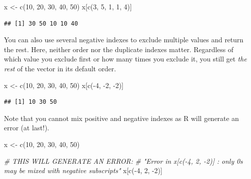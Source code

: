 \documentclass[
]{book}
\newenvironment{Shaded}{\begin{snugshade}}{\end{snugshade}}
\newcommand{\CommentTok}[1]{\textcolor[rgb]{0.56,0.35,0.01}{\textit{#1}}}
\newcommand{\DecValTok}[1]{\textcolor[rgb]{0.00,0.00,0.81}{#1}}
\newcommand{\FunctionTok}[1]{\textcolor[rgb]{0.00,0.00,0.00}{#1}}
\newcommand{\NormalTok}[1]{#1}
\newcommand{\OtherTok}[1]{\textcolor[rgb]{0.56,0.35,0.01}{#1}}
\newcommand{\SpecialCharTok}[1]{\textcolor[rgb]{0.00,0.00,0.00}{#1}}
\begin{document}
\begin{Shaded}
\begin{Highlighting}[]
\NormalTok{x }\OtherTok{\textless{}{-}} \FunctionTok{c}\NormalTok{(}\DecValTok{10}\NormalTok{, }\DecValTok{20}\NormalTok{, }\DecValTok{30}\NormalTok{, }\DecValTok{40}\NormalTok{, }\DecValTok{50}\NormalTok{)}
\NormalTok{x[}\FunctionTok{c}\NormalTok{(}\DecValTok{3}\NormalTok{, }\DecValTok{5}\NormalTok{, }\DecValTok{1}\NormalTok{, }\DecValTok{1}\NormalTok{, }\DecValTok{4}\NormalTok{)]}
\end{Highlighting}
\end{Shaded}

\begin{verbatim}
## [1] 30 50 10 10 40
\end{verbatim}

You can also use several negative indexes to exclude multiple values and return the rest. Here, neither order nor the duplicate indexes matter. Regardless of which value you exclude first or how many times you exclude it, you still get \emph{the rest} of the vector in its default order.

\begin{Shaded}
\begin{Highlighting}[]
\NormalTok{x }\OtherTok{\textless{}{-}} \FunctionTok{c}\NormalTok{(}\DecValTok{10}\NormalTok{, }\DecValTok{20}\NormalTok{, }\DecValTok{30}\NormalTok{, }\DecValTok{40}\NormalTok{, }\DecValTok{50}\NormalTok{)}
\NormalTok{x[}\FunctionTok{c}\NormalTok{(}\SpecialCharTok{{-}}\DecValTok{4}\NormalTok{, }\SpecialCharTok{{-}}\DecValTok{2}\NormalTok{, }\SpecialCharTok{{-}}\DecValTok{2}\NormalTok{)]}
\end{Highlighting}
\end{Shaded}

\begin{verbatim}
## [1] 10 30 50
\end{verbatim}

Note that you cannot mix positive and negative indexes as R will generate an error (at last!).

\begin{Shaded}
\begin{Highlighting}[]
\NormalTok{x }\OtherTok{\textless{}{-}} \FunctionTok{c}\NormalTok{(}\DecValTok{10}\NormalTok{, }\DecValTok{20}\NormalTok{, }\DecValTok{30}\NormalTok{, }\DecValTok{40}\NormalTok{, }\DecValTok{50}\NormalTok{)}

\CommentTok{\# THIS WILL GENERATE AN ERROR: }
\CommentTok{\# "Error in x[c({-}4, 2, {-}2)] : only 0\textquotesingle{}s may be mixed with negative subscripts"}
\NormalTok{x[}\FunctionTok{c}\NormalTok{(}\SpecialCharTok{{-}}\DecValTok{4}\NormalTok{, }\DecValTok{2}\NormalTok{, }\SpecialCharTok{{-}}\DecValTok{2}\NormalTok{)]}
\end{Highlighting}
\end{Shaded}
\end{document}
